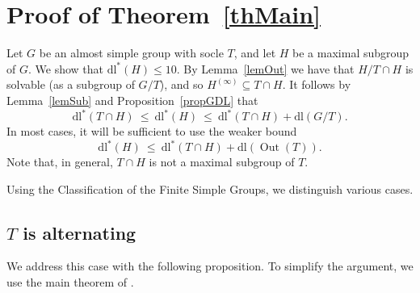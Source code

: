 \documentclass[11pt]{amsart}
\numberwithin{equation}{section}
\theoremstyle{definition}
\theoremstyle{remark}
\newcommand{\Out}{\mathop{\mathrm{Out}}}
\newcommand{\dll}{\mathrm{dl^*}}
\newcommand{\dl}{\mathrm{dl}}
\begin{document}
\vspace{0.1cm}
\section{Proof of Theorem~\ref{thMain}} \label{sec3}

Let $G$ be an almost simple group with socle $T$,
and let $H$ be a maximal subgroup of $G$.
We show that $\dll(H) \leq 10$.
By Lemma~\ref{lemOut} we have that $H/T \cap H$ is solvable (as a subgroup of $G/T$), and so $H^{(\infty)} \subseteq T \cap H$. It follows by Lemma~\ref{lemSub} and Proposition~\ref{propGDL} that
$$ \dll(T \cap H) \> \leq \>
\dll(H)
\> \leq \> \dll(T \cap H) + \dl(G/T) . $$
In most cases, it will be sufficient to use the weaker bound
$$ \dll(H) \> \leq \> \dll(T \cap H) + \dl( \Out(T) ) . $$
Note that, in general, $T \cap H$ is not a maximal subgroup of $T$.

Using the Classification of the Finite Simple Groups,
we distinguish various cases.






\subsection{$T$ is alternating} 

We address this case with the following proposition.
To simplify the argument, we use the main theorem of \cite{LPS87}.
\end{document}
